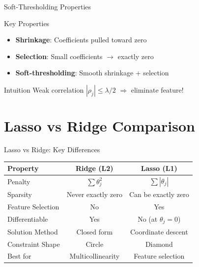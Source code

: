 \documentclass{beamer}
\begin{document}
\begin{frame}{Soft-Thresholding Properties}
\begin{keypointsbox}{Key Properties}
{\small
\begin{itemize}
\item \textbf{Shrinkage}: Coefficients pulled toward zero
\item \textbf{Selection}: Small coefficients $\rightarrow$ exactly zero
\item \textbf{Soft-thresholding}: Smooth shrinkage + selection
\end{itemize}
}
\end{keypointsbox}

\begin{examplebox}{Intuition}
Weak correlation $|\rho_j| \leq \lambda/2$ $\Rightarrow$ eliminate feature!
\end{examplebox}
\end{frame}

\section{Lasso vs Ridge Comparison}

\begin{frame}{Lasso vs Ridge: Key Differences}
\begin{table}[h]
\centering
\begin{tabular}{|l|c|c|}
\hline
\textbf{Property} & \textbf{Ridge (L2)} & \textbf{Lasso (L1)} \\
\hline
Penalty & $\sum \theta_j^2$ & $\sum |\theta_j|$ \\
\hline
Sparsity & Never exactly zero & Can be exactly zero \\
\hline
Feature Selection & No & Yes \\
\hline
Differentiable & Yes & No (at $\theta_j = 0$) \\
\hline
Solution Method & Closed form & Coordinate descent \\
\hline
Constraint Shape & Circle & Diamond \\
\hline
Best for & Multicollinearity & Feature selection \\
\hline
\end{tabular}
\end{table}
\end{frame}
\end{document}
